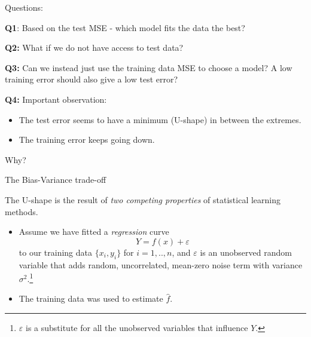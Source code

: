 \documentclass[
  ignorenonframetext,
]{beamer}
\providecommand{\tightlist}{%
  \setlength{\itemsep}{0pt}\setlength{\parskip}{0pt}}
\begin{document}
\begin{frame}
\begin{block}{Questions:}
\protect\hypertarget{questions}{}
\(~\)

\textbf{Q1}: Based on the test MSE - which model fits the data the best?

\vspace{2mm}

\textbf{Q2:} What if we do not have access to test data?

\vspace{2mm}

\textbf{Q3:} Can we instead just use the training data MSE to choose a
model? A low training error should also give a low test error?

\vspace{2mm}

\textbf{Q4:} Important observation:

\vspace{2mm}

\begin{itemize}
\item
  The test error seems to have a minimum (U-shape) in between the
  extremes.
\item
  The training error keeps going down.
\end{itemize}

\centering
\vspace{2mm}

Why?
\end{block}
\end{frame}

\begin{frame}{The Bias-Variance trade-off}
\protect\hypertarget{the-bias-variance-trade-off}{}
\vspace{2mm}

The U-shape is the result of \emph{two competing properties} of
statistical learning methods.

\vspace{2mm}

\begin{itemize}
\tightlist
\item
  Assume we have fitted a \emph{regression} curve
  \[Y  = f(x) + \varepsilon\] to our training data \(\{x_i, y_i\}\) for
  \(i=1,..,n\), and \(\varepsilon\) is an unobserved random variable
  that adds random, uncorrelated, mean-zero noise term with variance
  \(\sigma^2\).\footnote{$\varepsilon$ is a substitute for all the unobserved variables that influence $Y$.}
\end{itemize}

\vspace{2mm}

\begin{itemize}
\tightlist
\item
  The training data was used to estimate \(\hat{f}\).
\end{itemize}
\end{frame}
\end{document}
